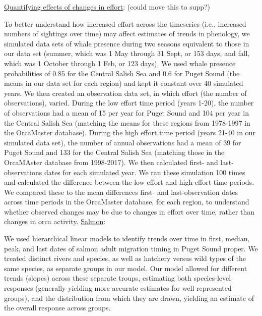 \documentclass{article}
\begin{document}
\underline{Quantifying effects of changes in effort}: (could move this to supp?)
\par To better understand how increased effort across the timeseries (i.e., increased numbers of sightings over time) may affect estimates of trends in phenology, we simulated data sets of whale presence during two seasons equivalent to those in our data set (summer, which was 1 May through 31 Sept, or 153 days, and fall, which was 1 October through 1 Feb, or 123 days). We used whale presence probabilities of 0.85 for the Central Salish Sea and 0.6 for Puget Sound (the means in our data set for each region) and kept it constant over 40 simulated years. We then created an observation data set, in which effort (the number of observations), varied. During the low effort time period (years 1-20), the number of observations had a mean of 15 per year for Puget Sound and 104 per year in the Central Salish Sea (matching the means for these regions from 1978-1997 in the OrcaMaster database).  During the high effort time period (years 21-40 in our simulated data set), the number of annual observations had a mean of 39 for Puget Sound and 133 for the Central Salish Sea (matching those in the OrcaMAster database from 1998-2017). We then calculated first- and last- observations dates for each simulated year. We ran these simulation 100 times and calculated the difference between the low effort and high effort time periods. We compared these to the mean differences first- and last-observation dates across time periods in the OrcaMaster database, for each region, to understand whether observed changes may be due to changes in effort over time, rather than changes in orca activity.
\underline{Salmon}:
\par We used hierarchical linear models to identify trends over time in first, median, peak, and last dates of salmon adult migration timing in Puget Sound proper. We treated distinct rivers and species, as well as hatchery versus wild types of the same species, as separate groups in our model. Our model allowed for different trends (slopes) across these separate troups, estimating both species-level responses (generally yielding more accurate estimates for well-represented groups), and the distribution from which they are drawn, yielding an estimate of the overall response across groups.
\end{document}
